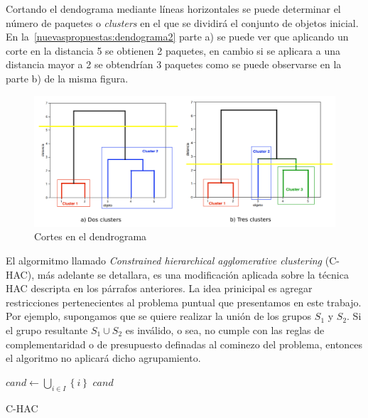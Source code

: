 Cortando el dendograma mediante líneas horizontales se puede determinar el número de paquetes o \emph{clusters} en el que se dividirá el conjunto de objetos inicial. En la~\autoref{nuevaspropuestas:dendograma2} parte a) se puede ver que aplicando un corte en la distancia 5 se obtienen 2 paquetes, en cambio si se aplicara a una distancia mayor a 2 se obtendrían 3 paquetes como se puede observarse en la parte b) de la misma figura.

\begin{figure}[H]
  \centering
    \includegraphics[width=1\textwidth]{img/dendograma02.png}
  \caption{Cortes en el dendrograma}
  \label{nuevaspropuestas:dendograma2}
\end{figure}

El algormitmo llamado \textit{Constrained hierarchical agglomerative clustering} (C-HAC), más adelante se detallara, es una modificación aplicada sobre la técnica HAC descripta en los párrafos anteriores. La idea prinicipal es agregar restricciones pertenecientes al problema puntual que presentamos en este trabajo. Por ejemplo, supongamos que se quiere realizar la unión de los grupos $S_1$ y $S_2$. Si el grupo resultante $S_1 \cup S_2$ es inválido, o sea, no cumple con las reglas de complementaridad o de presupuesto definadas al cominezo del problema, entonces el algoritmo no aplicará dicho agrupamiento.

\begin{center}
	\begin{algorithm}[H]
	\DontPrintSemicolon
	\SetAlgoLined
		$cand \leftarrow \bigcup_{i \in I}\left\{i\right\}$\; \label{alg:C-HAC:init}
		\Return $cand$\;
	\caption{C-HAC}\label{alg:C-HAC}
	\end{algorithm}
\end{center}

